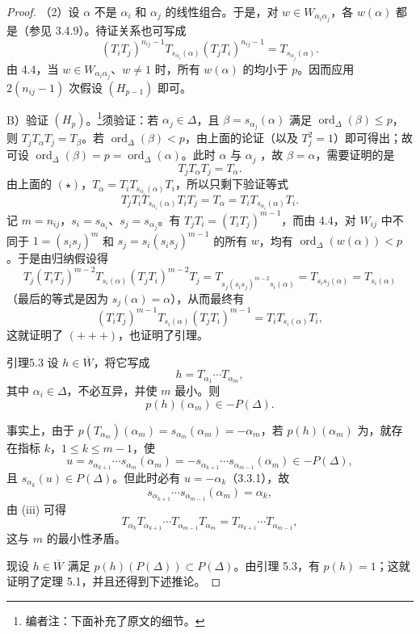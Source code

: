 \begin{proof}
（2）设 $\alpha$ 不是 $\alpha_i$ 和 $\alpha_j$ 的线性组合。于是，对 $w\in W_{\alpha_i\alpha_j}$，各 $w(\alpha)$ 都是（参见 3.4.9）。待证关系也可写成
\[(T_iT_j)^{n_{ij}-1}T_{s_{\alpha_i}(\alpha)}(T_jT_i)^{n_{ij}-1}=T_{s_{\alpha_j}(\alpha)}.\tag{++}\]
由 4.4，当 $w\in W_{\alpha_i\alpha_j}$、$w\ne1$ 时，所有 $w(\alpha)$ 的均小于 $p$。因而应用 $2(n_{ij}-1)$ 次假设 $(H_{p-1})$ 即可。

B）验证 $(H_p)$。\footnote{编者注：下面补充了原文的细节。}须验证：若 $\alpha_j\in\Delta$，且 $\beta=s_{\alpha_j}(\alpha)$ 满足 $\operatorname{ord}_\Delta(\beta)\leq p$，则 $T_jT_\alpha T_j=T_\beta$。若 $\operatorname{ord}_\Delta(\beta)<p$，由上面的论证（以及 $T_j^2=1$）即可得出；故可设 $\operatorname{ord}_\Delta(\beta)=p=\operatorname{ord}_\Delta(\alpha)$。此时 $\alpha$ 与 $\alpha_j$ ，故 $\beta=\alpha$，需要证明的是
\[T_jT_\alpha T_j=T_\alpha.\tag{$\dagger$}\]
由上面的 $(\star)$，$T_\alpha=T_iT_{s_{\alpha_i}(\alpha)}T_i$，所以只剩下验证等式
\[T_jT_iT_{s_{\alpha_i}(\alpha)}T_iT_j=T_\alpha=T_iT_{s_{\alpha_i}(\alpha)}T_i.\tag{+++}\]
记 $m=n_{ij}$，$s_i=s_{\alpha_i}$、$s_j=s_{\alpha_j}$。有 $T_jT_i=(T_iT_j)^{m-1}$，而由 4.4，对 $W_{ij}$ 中不同于 $1=(s_is_j)^m$ 和 $s_j=s_i(s_is_j)^{m-1}$ 的所有 $w$，均有 $\operatorname{ord}_\Delta(w(\alpha))<p$。于是由归纳假设得
\[T_j(T_iT_j)^{m-2}T_{s_i(\alpha)}(T_jT_i)^{m-2}T_j
=T_{s_j(s_is_j)^{m-2}s_i(\alpha)}=T_{s_is_j(\alpha)}=T_{s_i(\alpha)}\]
（最后的等式是因为 $s_j(\alpha)=\alpha$），从而最终有
\[(T_iT_j)^{m-1}T_{s_i(\alpha)}(T_jT_i)^{m-1}=T_iT_{s_i(\alpha)}T_i,\]
这就证明了 $(+++)$，也证明了引理。
\begin{SGAresult}{引理}{5.3}
设 $h\in\overline W$，将它写成
\[h=T_{\alpha_1}\cdots T_{\alpha_m},\]
其中 $\alpha_i\in\Delta$，不必互异，并使 $m$ 最小。则
\[p(h)(\alpha_m)\in-P(\Delta).\]
\end{SGAresult}
事实上，由于 $p(T_{\alpha_m})(\alpha_m)=s_{\alpha_m}(\alpha_m)=-\alpha_m$，若 $p(h)(\alpha_m)$ 为，就存在指标 $k$，$1\leq k\leq m-1$，使
\[u=s_{\alpha_{k+1}}\cdots s_{\alpha_m}(\alpha_m)
=-s_{\alpha_{k+1}}\cdots s_{\alpha_{m-1}}(\alpha_m)\in-P(\Delta),\]
且 $s_{\alpha_k}(u)\in P(\Delta)$。但此时必有 $u=-\alpha_k$（3.3.1），故
\[s_{\alpha_{k+1}}\cdots s_{\alpha_{m-1}}(\alpha_m)=\alpha_k,\]
由 (iii) 可得
\[T_{\alpha_k}T_{\alpha_{k+1}}\cdots T_{\alpha_{m-1}}T_{\alpha_m}
=T_{\alpha_{k+1}}\cdots T_{\alpha_{m-1}},\]
这与 $m$ 的最小性矛盾。

现设 $h\in\overline W$ 满足 $p(h)(P(\Delta))\subset P(\Delta)$。由引理 5.3，有 $p(h)=1$；这就证明了定理 5.1，并且还得到下述推论。
\end{proof}
